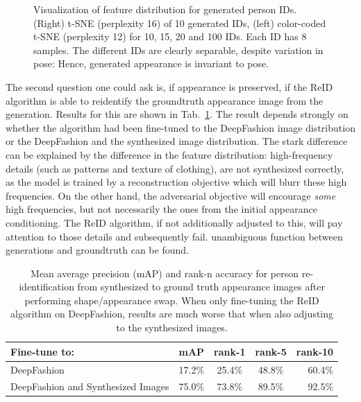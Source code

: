 \begin{figure}[htp]
			\caption{Visualization of feature distribution for generated person IDs. (Right) t-SNE (perplexity 16) of 10 generated IDs, (left) color-coded t-SNE (perplexity 12) for 10, 15, 20 and 100 IDs. Each ID has 8 samples. The different IDs are clearly separable, despite variation in pose: Hence, generated appearance is invariant to pose.}
			\label{fig:tsne}
		\end{figure}

		The second question one could ask is, if appearance is preserved, \ie if the ReID algorithm is able to reidentify the groundtruth appearance image from the generation. Results for this are shown in Tab.~\ref{tab:reiddirect}. The result depends strongly on whether the algorithm had been fine-tuned to the DeepFashion image distribution or the DeepFashion and the synthesized image distribution. The stark difference can be explained by the difference in the feature distribution: high-frequency details (such as patterns and texture of clothing), are not synthesized correctly, as the model is trained by a reconstruction objective which will blurr these high frequencies. On the other hand, the adversarial objective will encourage \textit{some} high frequencies, but not necessarily the ones from the initial appearance conditioning. The ReID algorithm, if not additionally adjusted to this, will pay attention to those details and subsequently fail.
		unambiguous function between generations and groundtruth can be found.

		\begin{table}[htp]
			\centering
			\caption{Mean average precision (mAP) and rank-n accuracy for person re-identification from synthesized to ground truth appearance images after performing shape/appearance swap. When only fine-tuning the ReID algorithm on DeepFashion, results are much worse that when also adjusting to the synthesized images.}
			\label{tab:reiddirect}
			\begin{tabular}{l|cccr}
				\hline
				Fine-tune to: & mAP & rank-1 & rank-5 & rank-10 \\ \hline
				DeepFashion & {17.2}\% & {25.4}\% &{48.8}\% & {60.4}\% \\
				DeepFashion and Synthesized Images& {75.0}\% & {73.8}\% &{89.5}\% & {92.5}\% \\ \hline
			\end{tabular}
		\end{table}






